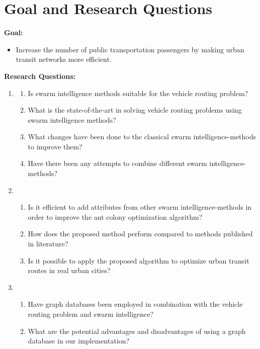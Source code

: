 \section{Goal and Research Questions}
\textbf{Goal:}
\begin{itemize}
\item \label{itm:goal} Increase the number of public transportation passengers by making urban transit networks more efficient.
\end{itemize}
\textbf{Research Questions:}
\begin{enumerate}[label=\textbf{\arabic*})]
\item \label{itm:1}
    \begin{enumerate}
    \item \label{itm:1a} Is swarm intelligence methods suitable for the vehicle routing problem?
    \item \label{itm:1b} What is the state-of-the-art in solving vehicle routing problems using swarm intelligence methods?
    \item \label{itm:1c} What changes have been done to the classical swarm intelligence-methods to improve them?
    \item \label{itm:1d} Have there been any attempts to combine different swarm intelligence-methods?
	\end{enumerate}
\item
    \begin{enumerate}
    \item \label{itm:2a} Is it efficient to add attributes from other swarm intelligence-methods in order to improve the ant colony optimization algorithm?
    \item \label{itm:2b1} How does the proposed method perform compared to methods published in literature?
    \item \label{itm:2c} Is it possible to apply the proposed algorithm to optimize urban transit routes in real urban cities?
    \end{enumerate}
\item
	\begin{enumerate}
    \item \label{itm:3b} Have graph databases been employed in combination with the vehicle routing problem and swarm intelligence?
	\item \label{itm:3a} What are the potential advantages and disadvantages of using a graph database in our implementation?
    \end{enumerate}
\end{enumerate}